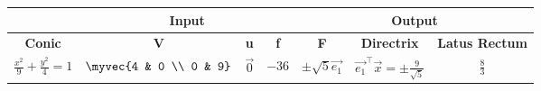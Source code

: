 \begin{tabular}{|c|c|c|c|c|c|c|}
\hline
\multicolumn{1}{|c|}{} & \multicolumn{3}{c|}{\textbf{Input}} & \multicolumn{3}{c|}{\textbf{Output}} \\ \hline
\textbf{Conic} & \textbf{V} & \textbf{u} & \textbf{f} & \textbf{F} & \textbf{Directrix} & \textbf{Latus Rectum} \\ \hline
$\frac{x^2}{9}+\frac{y^2}{4} = 1$ & $\myvec{4 & 0 \\ 0 & 9}$ & $\vec{0}$ & $-36$ & $\pm\sqrt{5}\vec{e_1}$ & $\vec{e_1}^{\top}\vec{x} = \pm\frac{9}{\sqrt{5}}$ & $\frac{8}{3}$ \\ 
\hline
\end{tabular}
